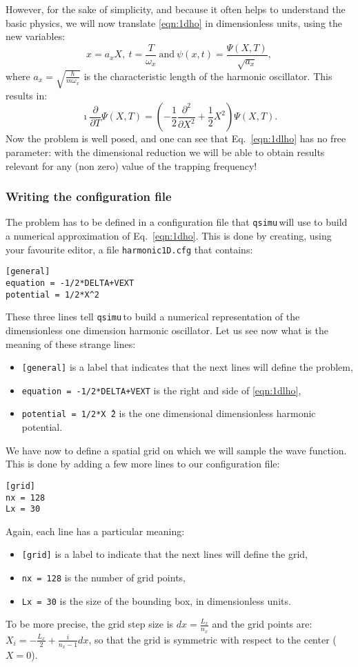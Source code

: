 \documentclass[12pt,a4paper]{report}
\newcommand{\qsimu}{\texttt{qsimu}\,}
\begin{document}
However, for the sake of simplicity, and because it often helps to understand the basic physics, we will now translate \eqref{eqn:1dho} in dimensionless units, using the new variables:
\begin{equation*}
x=a_xX,~t=\frac{T}{\omega_x}~\textrm{and}~\psi(x,t)=\frac{\Psi(X,T)}{\sqrt{a_x}},
\end{equation*}
where $a_x=\sqrt{\frac{\hbar}{m\omega_x}}$ is the characteristic length of the harmonic oscillator.
This results in:
\begin{equation}
\imath\frac{\partial}{\partial T}\Psi(X,T)=\left(-\frac{1}{2}\frac{\partial^2}{\partial X^2}+\frac{1}{2}X^2\right)\Psi(X,T).
\label{eqn:1dlho}
\end{equation}
Now the problem is well posed, and one can see that Eq.~\eqref{eqn:1dlho} has no free parameter: with the dimensional reduction we will be able to obtain results relevant for any (non zero) value of the trapping frequency!

\subsubsection{Writing the configuration file}
The problem has to be defined in a configuration file that \qsimu will use to build a numerical approximation of Eq.~\eqref{eqn:1dho}.
This is done by creating, using your favourite editor, a file \texttt{harmonic1D.cfg} that contains:
\begin{verbatim}
[general]
equation = -1/2*DELTA+VEXT
potential = 1/2*X^2
\end{verbatim}
These three lines tell \qsimu to build a numerical representation of the dimensionless one dimension harmonic oscillator.
Let us see now what is the meaning of these strange lines:
\begin{itemize}
\item\texttt{[general]} is a label that indicates that the next lines will define the problem,
\item\texttt{equation = -1/2*DELTA+VEXT} is the right and side of \eqref{eqn:1dlho},
\item\texttt{potential = 1/2*X\^\,2} is the one dimensional dimensionless harmonic potential.
\end{itemize}

We have now to define a spatial grid on which we will sample the wave function.
This is done by adding a few more lines to our configuration file:
\begin{verbatim}
[grid]
nx = 128
Lx = 30
\end{verbatim}
Again, each line has a particular meaning:
\begin{itemize}
\item \texttt{[grid]} is a label to indicate that the next lines will define the grid,
\item \texttt{nx = 128} is the number of grid points,
\item \texttt{Lx = 30} is the size of the bounding box, in dimensionless units.
\end{itemize}
To be more precise, the grid step size is $dx=\frac{L_x}{n_x}$ and the grid points are: $X_i=-\frac{L_x}{2}+\frac{i}{n_x-1}dx$, so that the grid is symmetric with respect to the center ($X=0$).
\end{document}

